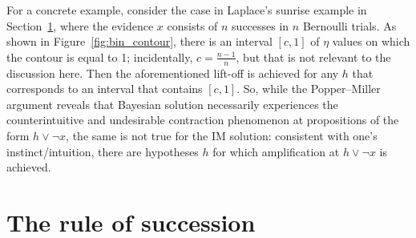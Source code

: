 \documentclass[a4paper, 12pt]{article}
\theoremstyle{plain}
\theoremstyle{definition}
\theoremstyle{remark}
\newcommand{\prob}{\mathsf{P}}
\newcommand{\lPi}{\rotatebox[origin=c]{180}{$\mathsf{\Pi}$}} %
\newcommand{\uPi}{\mathsf{\Pi}}%
\begin{document}
For a concrete example, consider the case in Laplace's sunrise example in Section~\ref{S:succession}, where the evidence $x$ consists of $n$ successes in $n$ Bernoulli trials.  As shown in Figure~\ref{fig:bin_contour}, there is an interval $[c,1]$ of $\eta$ values on which the contour is equal to 1; incidentally, $c=\frac{n-1}{n}$, but that is not relevant to the discussion here.  Then the aforementioned lift-off is achieved for any $h$ that corresponds to an interval that contains $[c,1]$.  So, while the Popper--Miller argument reveals that Bayesian solution necessarily experiences the counterintuitive and undesirable contraction phenomenon at propositions of the form $h \lor \neg x$, the same is not true for the IM solution: consistent with one's instinct/intuition, there are hypotheses $h$ for which amplification at $h \lor \neg x$ is achieved.  







\section{The rule of succession}
\label{S:succession}
\end{document}
